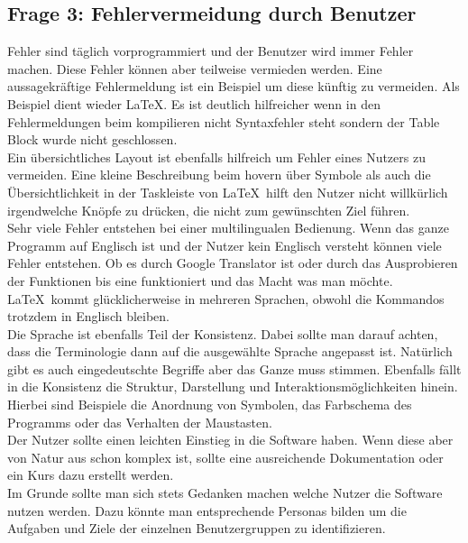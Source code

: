 \documentclass{TUBAFarbeiten}
\begin{document}
\subsection{Frage 3: Fehlervermeidung durch Benutzer}
Fehler sind täglich vorprogrammiert und der Benutzer wird immer Fehler machen. Diese Fehler können aber teilweise vermieden werden. Eine aussagekräftige Fehlermeldung ist ein Beispiel um diese künftig zu vermeiden. Als Beispiel dient wieder \LaTeX. Es ist deutlich hilfreicher wenn in den Fehlermeldungen beim kompilieren nicht \glqq Syntaxfehler\grqq{} steht sondern \glqq der Table Block wurde nicht geschlossen\grqq{}. \\
Ein übersichtliches Layout ist ebenfalls hilfreich um Fehler eines Nutzers zu vermeiden. Eine kleine Beschreibung beim hovern über Symbole als auch die Übersichtlichkeit in der Taskleiste von \LaTeX\ hilft den Nutzer nicht willkürlich irgendwelche Knöpfe zu drücken, die nicht zum gewünschten Ziel führen. \\
Sehr viele Fehler entstehen bei einer multilingualen Bedienung. Wenn das ganze Programm auf Englisch ist und der Nutzer kein Englisch versteht können viele Fehler entstehen. Ob es durch Google Translator ist oder durch das Ausprobieren der Funktionen bis eine funktioniert und das Macht was man möchte. \LaTeX\ kommt glücklicherweise in mehreren Sprachen, obwohl die Kommandos trotzdem in Englisch bleiben. \\
Die Sprache ist ebenfalls Teil der Konsistenz. Dabei sollte man darauf achten, dass die Terminologie dann auf die ausgewählte Sprache angepasst ist. Natürlich gibt es auch \glqq eingedeutschte\grqq{} Begriffe aber das Ganze muss stimmen. Ebenfalls fällt in die Konsistenz die Struktur, Darstellung und Interaktionsmöglichkeiten hinein. Hierbei sind Beispiele die Anordnung von Symbolen, das Farbschema des Programms oder das Verhalten der Maustasten. \\
Der Nutzer sollte einen leichten Einstieg in die Software haben. Wenn diese aber von Natur aus schon komplex ist, sollte eine ausreichende Dokumentation oder ein Kurs dazu erstellt werden. \\
Im Grunde sollte man sich stets Gedanken machen welche Nutzer die Software nutzen werden. Dazu könnte man entsprechende Personas bilden um die Aufgaben und Ziele der einzelnen Benutzergruppen zu identifizieren.

\newpage
\end{document}
